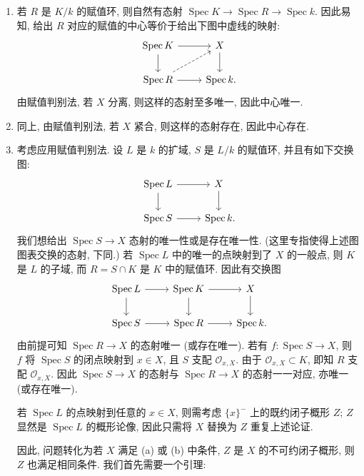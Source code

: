 \documentclass{article}
\theoremstyle{exercise}
\theoremstyle{plain}
\theoremstyle{remark}
\newenvironment{proofc}{\proof}{\endproof}
\def\cO{\mathscr{O}}
\def\Spec{\operatorname{Spec}}
\begin{document}
\begin{proofc}
  \begin{enumerate}[label=(\alph*)]
    \item 若 $R$ 是 $K / k$ 的赋值环, 则自然有态射 $\Spec K \to \Spec R \to \Spec k$.
          因此易知, 给出 $R$ 对应的赋值的中心等价于给出下图中虚线的映射:
          \[\begin{tikzcd}
              \Spec K \ar[r] \ar[d] & X \ar[d] \\
              \Spec R \ar[r] \ar[ur, dashed] & \Spec k\rlap{.}
            \end{tikzcd}\]
          由赋值判别法, 若 $X$ 分离, 则这样的态射至多唯一, 因此中心唯一.
    \item 同上, 由赋值判别法, 若 $X$ 紧合, 则这样的态射存在, 因此中心存在.
    \item 考虑应用赋值判别法. 设 $L$ 是 $k$ 的扩域, $S$ 是 $L / k$ 的赋值环,
          并且有如下交换图:
          \[\begin{tikzcd}
              \Spec L \ar[r] \ar[d] & X \ar[d] \\
              \Spec S \ar[r] & \Spec k\rlap{.}
            \end{tikzcd}\]
          我们想给出 $\Spec S \to X$ 态射的唯一性或是存在唯一性.
          (这里专指使得上述图图表交换的态射, 下同.)
          若 $\Spec L$ 中的唯一的点映射到了 $X$ 的一般点,
          则 $K$ 是 $L$ 的子域, 而 $R = S \cap K$ 是 $K$ 中的赋值环.
          因此有交换图
          \[\begin{tikzcd}
              \Spec L \ar[r] \ar[d] & \Spec K \ar[r] \ar[d] & X \ar[d] \\
              \Spec S \ar[r] & \Spec R \ar[r] & \Spec k\rlap{.}
            \end{tikzcd}\]
          由前提可知 $\Spec R \to X$ 的态射唯一 (或存在唯一).
          若有 $f \colon \Spec S \to X$,
          则 $f$ 将 $\Spec S$ 的闭点映射到 $x \in X$, 且 $S$ 支配 $\cO_{x, X}$.
          由于 $\cO_{x, X} \subset K$, 即知 $R$ 支配 $\cO_{x, X}$.
          因此 $\Spec S \to X$ 的态射与 $\Spec R \to X$ 的态射一一对应,
          亦唯一 (或存在唯一).

          若 $\Spec L$ 的点映射到任意的 $x \in X$,
          则需考虑 $\{ x \}^{-}$ 上的既约闭子概形 $Z$;
          $Z$ 显然是 $\Spec L$ 的概形论像, 因此只需将 $X$ 替换为 $Z$ 重复上述论证.

          因此, 问题转化为若 $X$ 满足 (a) 或 (b) 中条件,
          $Z$ 是 $X$ 的不可约闭子概形, 则 $Z$ 也满足相同条件.
          我们首先需要一个引理:


\end{enumerate}
\end{proofc}
\end{document}
